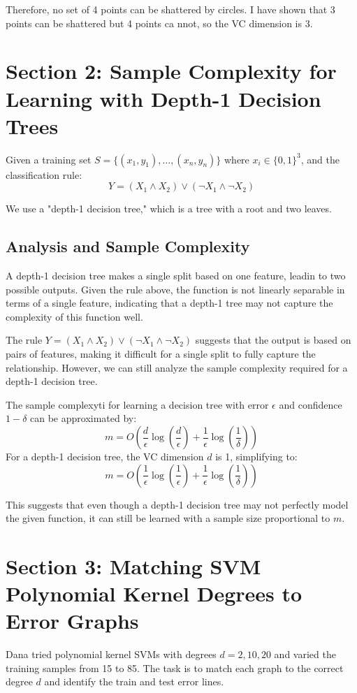 \documentclass[a4paper, 12pt]{article}
\begin{document}
Therefore, no set of 4 points can be shattered by circles. I have shown that 3 points can be shattered but 4 points ca nnot, so the VC dimension is 3.

\section*{Section 2: Sample Complexity for Learning with Depth-1 Decision Trees}
Given a training set $S = \{(x_1, y_1), \ldots, (x_n, y_n)\}$ where $x_i \in \{0,1\}^3$, and the classification rule:
\[
Y = (X_1 \land X_2) \lor (\neg X_1 \land \neg X_2)
\]

We use a "depth-1 decision tree," which is a tree with a root and two leaves.

\subsection*{Analysis and Sample Complexity}

A depth-1 decision tree makes a single split based on one feature, leadin to two possible outputs. Given the rule above, the function is not linearly separable in terms of a single feature, indicating that a depth-1 tree may not capture the complexity of this function well.

The rule $Y = (X_1 \land X_2) \lor (\neg X_1 \land \neg X_2)$ suggests that the output is based on pairs of features, making it difficult for a single split to fully capture the relationship. However, we can still analyze the sample complexity required for a depth-1 decision tree.

The sample complexyti for learning a decision tree with error $\epsilon$ and confidence $1 - \delta$ can be approximated by:
\[
m = O\left(\frac{d}{\epsilon} \log\left(\frac{d}{\epsilon}\right) + \frac{1}{\epsilon} \log\left(\frac{1}{\delta}\right)\right)
\]
For a depth-1 decision tree, the VC dimension $d$ is 1, simplifying to:
\[
m = O\left(\frac{1}{\epsilon} \log\left(\frac{1}{\epsilon}\right) + \frac{1}{\epsilon} \log\left(\frac{1}{\delta}\right)\right)
\]

This suggests that even though a depth-1 decision tree may not perfectly model the given function, it can still be learned with a sample size proportional to $m$.

\section*{Section 3: Matching SVM Polynomial Kernel Degrees to Error Graphs}
Dana tried polynomial kernel SVMs with degrees $d=2, 10, 20$ and varied the training samples from 15 to 85. The task is to match each graph to the correct degree $d$ and identify the train and test error lines.
\end{document}
